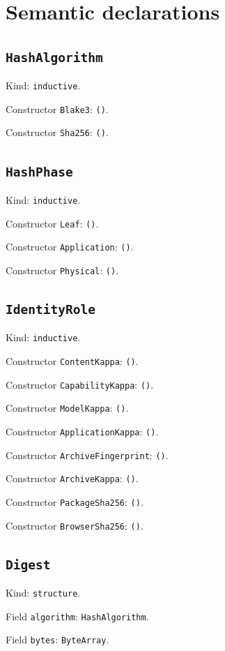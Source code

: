\documentclass[11pt]{article}
\begin{document}
\section*{Semantic declarations}
\subsection*{\texttt{HashAlgorithm}}
\noindent Kind: \texttt{inductive}.\par
\noindent Constructor \texttt{Blake3}: \texttt{()}.\par
\noindent Constructor \texttt{Sha256}: \texttt{()}.\par
\subsection*{\texttt{HashPhase}}
\noindent Kind: \texttt{inductive}.\par
\noindent Constructor \texttt{Leaf}: \texttt{()}.\par
\noindent Constructor \texttt{Application}: \texttt{()}.\par
\noindent Constructor \texttt{Physical}: \texttt{()}.\par
\subsection*{\texttt{IdentityRole}}
\noindent Kind: \texttt{inductive}.\par
\noindent Constructor \texttt{ContentKappa}: \texttt{()}.\par
\noindent Constructor \texttt{CapabilityKappa}: \texttt{()}.\par
\noindent Constructor \texttt{ModelKappa}: \texttt{()}.\par
\noindent Constructor \texttt{ApplicationKappa}: \texttt{()}.\par
\noindent Constructor \texttt{ArchiveFingerprint}: \texttt{()}.\par
\noindent Constructor \texttt{ArchiveKappa}: \texttt{()}.\par
\noindent Constructor \texttt{PackageSha256}: \texttt{()}.\par
\noindent Constructor \texttt{BrowserSha256}: \texttt{()}.\par
\subsection*{\texttt{Digest}}
\noindent Kind: \texttt{structure}.\par
\noindent Field \texttt{algorithm}: \texttt{HashAlgorithm}.\par
\noindent Field \texttt{bytes}: \texttt{ByteArray}.\par
\end{document}
